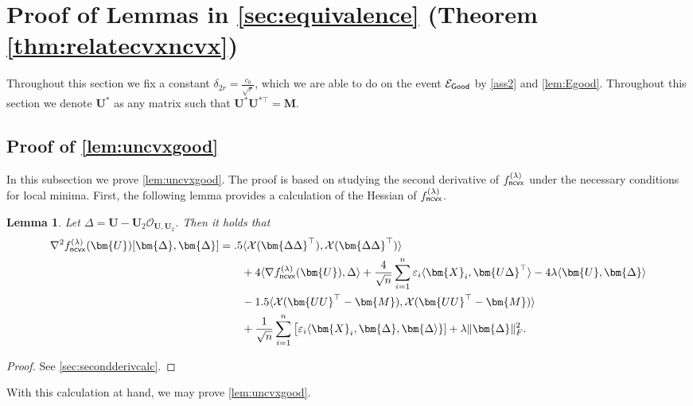\documentclass[10pt]{article}
\newcommand{\eps}{\ensuremath{\varepsilon}}
\newcommand{\s}{^*}
\renewcommand{\t}{^{\top}}
\newtheorem{lemma}{Lemma}
\theoremstyle{definition}
\begin{document}
\section{Proof of Lemmas in \cref{sec:equivalence} (Theorem \ref{thm:relatecvxncvx})}
\label{sec:cvxncvx}


 Throughout this section we fix a constant $\delta_{2r} = \frac{c_0}{\sqrt{r}}$, which we are able to do on the event $\mathcal{E}_{{\sf Good}}$ by \cref{ass2} and \cref{lem:Egood}.   Throughout this section we denote $\bm{U}\s$ as any matrix such that $\bm{U}\s \bm{U}^{*\top} = \bm{M}$.  

\subsection{Proof of \cref{lem:uncvxgood}} \label{sec:uncvxgoodproof}
In this subsection we prove \cref{lem:uncvxgood}. The proof is based on studying the second derivative of $f^{(\lambda)}_{{\sf ncvx}}$ under the necessary conditions for local minima. First, the following lemma provides a calculation of the Hessian of $f^{(\lambda)}_{{\sf ncvx}}$.  

\begin{lemma}\label{lem:secondderivcalc}
    Let $\Delta = \bm{U} - \bm{U}_2\mathcal{O}_{\bm{U},\bm{U}_2}$.  Then it holds that
    \begin{align}
     \nabla^2 f^{(\lambda)}_{{\sf ncvx}}(\bm{U}) [ \bm{\Delta},\bm{\Delta}] &= .5 \langle \mathcal{X}(\bm{\Delta \Delta}\t), \mathcal{X}(\bm{\Delta \Delta}\t) \rangle \\
    &\qquad + 4  \langle \nabla f^{(\lambda)}_{{\sf ncvx}}(\bm{U}),\Delta \rangle + \frac{4}{\sqrt{n}} \sum_{i=1}^{n} \eps_i\langle \bm{X}_i, \bm{U\Delta}\t \rangle - 4 \lambda \langle \bm{U},\bm{\Delta} \rangle \\
   &\qquad - 1.5 \langle \mathcal{X}(\bm{UU}\t - \bm{M}) ,\mathcal{X}(\bm{UU}\t - \bm{M}) \rangle \\
    &\qquad + \frac{1}{\sqrt{n}} \sum_{i=1}^{n} \big[ \eps_i \langle \bm{X}_i, \bm{\Delta},\bm{\Delta \rangle}] +  \lambda \| \bm{\Delta}\|_F^2.
\end{align}
\end{lemma}
\begin{proof}
    See \cref{sec:secondderivcalc}.
\end{proof}

With this calculation at hand, we may prove \cref{lem:uncvxgood}.
\end{document}
